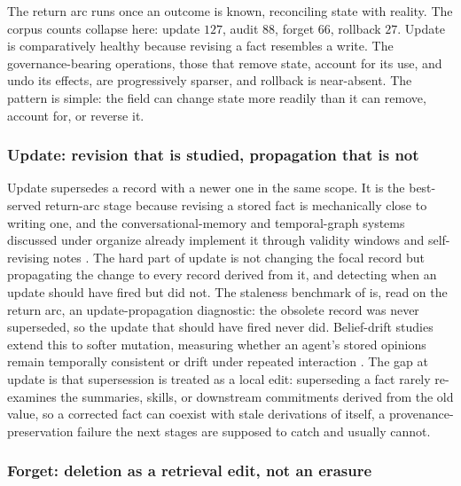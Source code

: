 The return arc runs once an outcome is known, reconciling state with reality. The corpus counts collapse here: update $127$, audit $88$, forget $66$, rollback $27$. Update is comparatively healthy because revising a fact resembles a write. The governance-bearing operations, those that remove state, account for its use, and undo its effects, are progressively sparser, and rollback is near-absent. The pattern is simple: the field can change state more readily than it can remove, account for, or reverse it.

\subsubsection{Update: revision that is studied, propagation that is not}

Update supersedes a record with a newer one in the same scope. It is the best-served return-arc stage because revising a stored fact is mechanically close to writing one, and the conversational-memory and temporal-graph systems discussed under organize already implement it through validity windows and self-revising notes \citep{rasmussen2025zep,xu2025amemagenticmemoryllm}. The hard part of update is not changing the focal record but propagating the change to every record derived from it, and detecting when an update should have fired but did not. The staleness benchmark of \citet{chao2026stalellmagentsknow} is, read on the return arc, an update-propagation diagnostic: the obsolete record was never superseded, so the update that should have fired never did. Belief-drift studies extend this to softer mutation, measuring whether an agent's stored opinions remain temporally consistent or drift under repeated interaction \citep{myakala2026beliefshiftbenchmarkingtemporalbelief}. The gap at update is that supersession is treated as a local edit: superseding a fact rarely re-examines the summaries, skills, or downstream commitments derived from the old value, so a corrected fact can coexist with stale derivations of itself, a provenance-preservation failure the next stages are supposed to catch and usually cannot.

\subsubsection{Forget: deletion as a retrieval edit, not an erasure}

